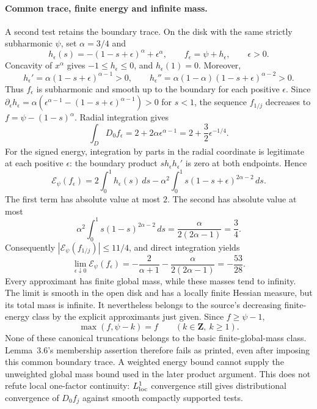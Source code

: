 \paragraph{Common trace, finite energy and infinite mass.}
A second test retains the boundary trace. On the disk with the same
strictly subharmonic $\psi$, set $\alpha=3/4$ and
\[
 h_\epsilon(s)=-(1-s+\epsilon)^\alpha+\epsilon^\alpha,\qquad
 f_\epsilon=\psi+h_\epsilon,\qquad \epsilon>0.
\]
Concavity of $x^\alpha$ gives $-1\leq h_\epsilon\leq0$,
and $h_\epsilon(1)=0$. Moreover,
\[
 h_\epsilon'=\alpha(1-s+\epsilon)^{\alpha-1}>0,\qquad
 h_\epsilon''=\alpha(1-\alpha)(1-s+\epsilon)^{\alpha-2}>0.
\]
Thus $f_\epsilon$ is subharmonic and smooth up to the boundary for
each positive $\epsilon$. Since
$\partial_\epsilon h_\epsilon
=\alpha(\epsilon^{\alpha-1}-(1-s+\epsilon)^{\alpha-1})>0$
for $s<1$, the sequence $f_{1/j}$ decreases to
$f=\psi-(1-s)^\alpha$.
Radial integration gives
\[
 \int_DD_0f_\epsilon
 =2+2\alpha\epsilon^{\alpha-1}
 =2+\frac32\epsilon^{-1/4}.
\]
For the signed energy, integration by parts in the radial coordinate
is legitimate at each positive $\epsilon$: the boundary product
$s h_\epsilon h_\epsilon'$ is zero at both endpoints. Hence
\[
 \mathcal E_\psi(f_\epsilon)
 =2\int_0^1h_\epsilon(s)\,ds
  -\alpha^2\int_0^1s(1-s+\epsilon)^{2\alpha-2}\,ds.
\]
The first term has absolute value at most $2$. The second has absolute
value at most
\[
 \alpha^2\int_0^1s(1-s)^{2\alpha-2}\,ds
 =\frac{\alpha}{2(2\alpha-1)}=\frac34.
\]
Consequently $|\mathcal E_\psi(f_{1/j})|\leq11/4$, and direct
integration yields
\[
 \lim_{\epsilon\downarrow0}\mathcal E_\psi(f_\epsilon)
 =-\frac{2}{\alpha+1}-\frac{\alpha}{2(2\alpha-1)}
 =-\frac{53}{28}.
\]
Every approximant has finite global mass, while these masses tend to
infinity. The limit is smooth in the open disk and has a locally finite
Hessian measure, but its total mass is infinite. It nevertheless
belongs to the source's decreasing finite-energy class by the explicit
approximants just given. Since $f\geq\psi-1$,
\[
 \max(f,\psi-k)=f\qquad(k\in\mathbf Z,\ k\geq1).
\]
None of these canonical truncations belongs to the basic
finite-global-mass class. Lemma~3.6's membership assertion therefore
fails as printed, even after imposing this common boundary trace.
A weighted energy bound cannot supply the unweighted global mass bound
used in the later product argument. This does not refute local
one-factor continuity: $L^1_{\rm loc}$ convergence still gives
distributional convergence of $D_0f_j$ against smooth compactly
supported tests.

